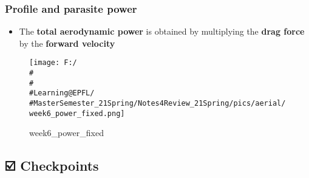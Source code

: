 \documentclass[]{article}
\begin{document}
\subsubsection{Profile and parasite power}\label{header-n1182}

\begin{itemize}
\item
  The \textbf{total aerodynamic power} is obtained by multiplying the
  \textbf{drag force} by the \textbf{forward velocity}
\end{itemize}

\begin{figure}
\centering
\texttt{[image: F:/\\\#\\\#\\\#Learning@EPFL/\\\#MasterSemester\_21Spring/Notes4Review\_21Spring/pics/aerial/week6\_power\_fixed.png]}
\caption{week6\_power\_fixed}
\end{figure}

\subsection{☑️ Checkpoints}\label{header-n1187}
\end{document}
